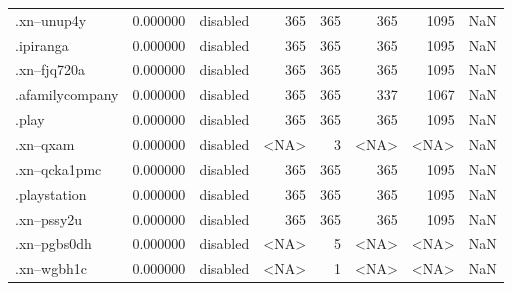 \begin{tabular}{lrlrrrrl}
.xn--unup4y               &          0.000000 &        disabled &                         365 &                         365 &                         365 &                1095 &                  NaN \\
.ipiranga                 &          0.000000 &        disabled &                         365 &                         365 &                         365 &                1095 &                  NaN \\
.xn--fjq720a              &          0.000000 &        disabled &                         365 &                         365 &                         365 &                1095 &                  NaN \\
.afamilycompany           &          0.000000 &        disabled &                         365 &                         365 &                         337 &                1067 &                  NaN \\
.play                     &          0.000000 &        disabled &                         365 &                         365 &                         365 &                1095 &                  NaN \\
.xn--qxam                 &          0.000000 &        disabled &                        <NA> &                           3 &                        <NA> &                <NA> &                  NaN \\
.xn--qcka1pmc             &          0.000000 &        disabled &                         365 &                         365 &                         365 &                1095 &                  NaN \\
.playstation              &          0.000000 &        disabled &                         365 &                         365 &                         365 &                1095 &                  NaN \\
.xn--pssy2u               &          0.000000 &        disabled &                         365 &                         365 &                         365 &                1095 &                  NaN \\
.xn--pgbs0dh              &          0.000000 &        disabled &                        <NA> &                           5 &                        <NA> &                <NA> &                  NaN \\
.xn--wgbh1c               &          0.000000 &        disabled &                        <NA> &                           1 &                        <NA> &                <NA> &                  NaN \\

\end{tabular}
